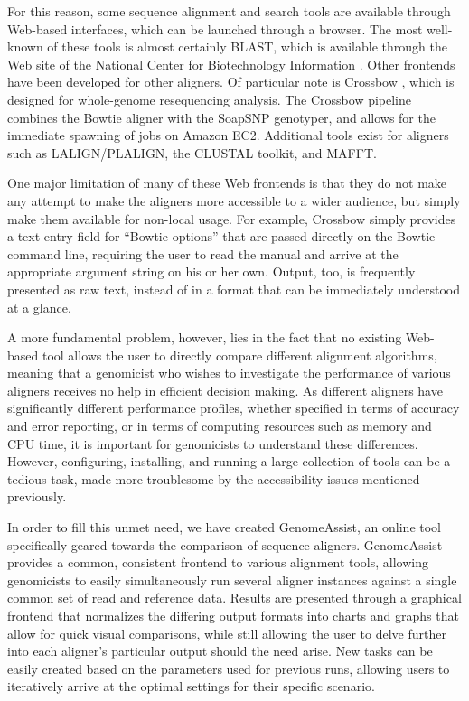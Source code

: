 \documentclass[11pt,twocolumn]{article}
\begin{document}
For this reason, some sequence alignment and search tools are available
through Web-based interfaces, which can be launched through a browser.
The most well-known of these tools is almost certainly BLAST, which is
available through the Web site of the National Center for Biotechnology
Information \cite{BLAST}.
Other frontends have been developed for other aligners.
Of particular note is Crossbow \cite{Crossbow}, which is designed for
whole-genome resequencing analysis.
The Crossbow pipeline combines the Bowtie aligner with the SoapSNP
genotyper, and allows for the immediate spawning of jobs on Amazon EC2.
Additional tools exist for aligners such as LALIGN/PLALIGN, the CLUSTAL
toolkit, and MAFFT.

One major limitation of many of these Web frontends is that they do not
make any attempt to make the aligners more accessible to a wider
audience, but simply make them available for non-local usage.
For example, Crossbow simply provides a text entry field for ``Bowtie
options'' that are passed directly on the Bowtie command line, requiring
the user to read the manual and arrive at the appropriate argument
string on his or her own.
Output, too, is frequently presented as raw text, instead of in a format
that can be immediately understood at a glance.

A more fundamental problem, however, lies in the fact that no existing
Web-based tool allows the user to directly compare different alignment
algorithms, meaning that a genomicist who wishes to investigate the
performance of various aligners receives no help in efficient decision
making.
As different aligners have significantly different performance profiles,
whether specified in terms of accuracy and error reporting, or in terms
of computing resources such as memory and CPU time, it is important for
genomicists to understand these differences.
However, configuring, installing, and running a large collection of
tools can be a tedious task, made more troublesome by the accessibility
issues mentioned previously.

In order to fill this unmet need, we have created GenomeAssist, an
online tool specifically geared towards the comparison of sequence
aligners.
GenomeAssist provides a common, consistent frontend to various alignment
tools, allowing genomicists to easily simultaneously run several aligner
instances against a single common set of read and reference data.
Results are presented through a graphical frontend that normalizes the
differing output formats into charts and graphs that allow for quick
visual comparisons, while still allowing the user to delve further into
each aligner's particular output should the need arise.
New tasks can be easily created based on the parameters used for
previous runs, allowing users to iteratively arrive at the optimal
settings for their specific scenario.
\end{document}
